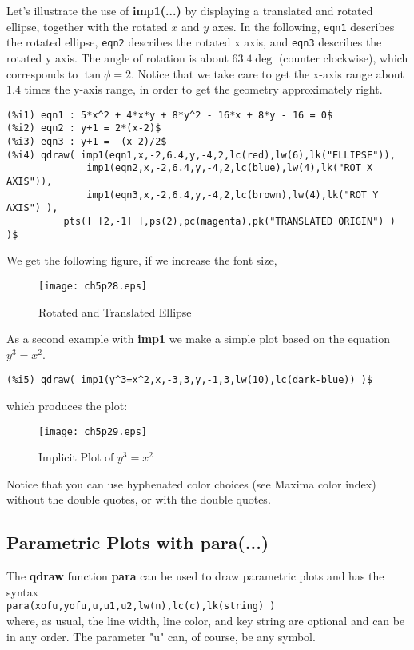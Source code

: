 \documentclass[12pt]{article}
\begin{document}
\smallskip
Let's illustrate the use of \textbf{imp1(...)} by displaying a translated
  and rotated ellipse, together with the rotated $x$ and $y$ axes.
In the following, \verb|eqn1| describes the rotated ellipse, \verb|eqn2|
  describes the rotated x axis, and \verb|eqn3| describes the
  rotated y axis.  
The angle of rotation is about $63.4 \deg$ (counter clockwise), which corresponds
  to $\tan{\phi} = 2$.
Notice that we take care to get the x-axis range about $1.4$ times 
  the y-axis range, in order to get the geometry approximately
  right.
\small
\begin{verbatim}
(%i1) eqn1 : 5*x^2 + 4*x*y + 8*y^2 - 16*x + 8*y - 16 = 0$
(%i2) eqn2 : y+1 = 2*(x-2)$
(%i3) eqn3 : y+1 = -(x-2)/2$
(%i4) qdraw( imp1(eqn1,x,-2,6.4,y,-4,2,lc(red),lw(6),lk("ELLIPSE")),
              imp1(eqn2,x,-2,6.4,y,-4,2,lc(blue),lw(4),lk("ROT X AXIS")),
              imp1(eqn3,x,-2,6.4,y,-4,2,lc(brown),lw(4),lk("ROT Y AXIS") ),
          pts([ [2,-1] ],ps(2),pc(magenta),pk("TRANSLATED ORIGIN") ) )$
\end{verbatim}
\normalsize
We get the following figure, if we increase the font size,

\begin{figure} [h]
   \centerline{\texttt{[image: ch5p28.eps]} }
	\caption{Rotated and Translated Ellipse }
\end{figure}        
 \newpage
 
As a second example with \textbf{imp1} we make a simple plot 
  based on the equation $y^3 = x^2$.
\small
\begin{verbatim}
(%i5) qdraw( imp1(y^3=x^2,x,-3,3,y,-1,3,lw(10),lc(dark-blue)) )$
\end{verbatim}
\normalsize

which produces the plot:
\begin{figure} [h]
   \centerline{\texttt{[image: ch5p29.eps]} }
	\caption{Implicit Plot of $y^3 = x^2$ }
\end{figure}      

\smallskip
Notice that you can use hyphenated color choices (see Maxima color index) without the double
  quotes, or with the double quotes.
  
\newpage

  
\subsection{Parametric Plots with para(...) }
The \textbf{qdraw} function \textbf{para} can be used to draw parametric plots
and has the syntax\\
\verb|para(xofu,yofu,u,u1,u2,lw(n),lc(c),lk(string) )|\\
where, as usual, the line width, line color, and key string
  are optional and can be in any order.
The parameter "u" can, of course, be any symbol.
\end{document}

